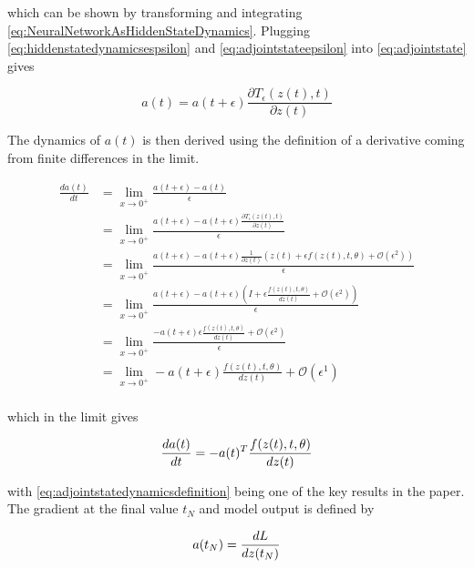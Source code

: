 \documentclass[10pt]{reportMaster}
\begin{document}
which can be shown by transforming and integrating \ref{eq:NeuralNetworkAsHiddenStateDynamics}. Plugging \ref{eq:hiddenstatedynamicsespsilon} and \ref{eq:adjointstateepsilon} into \ref{eq:adjointstate} gives

\begin{equation}
\label{eq:adjointstatedefinition}
a(t) = a(t+\epsilon) \frac{\partial T_{\epsilon}(z(t), t)}{\partial z(t)}
\end{equation}

The dynamics of $a(t)$ is then derived using the definition of a derivative coming from finite differences in the limit.

\begin{equation} \begin{split}
\label{eq:adjstate} 
\frac{da(t)}{dt}
& =  \lim_{x \to 0^{+}}  \frac{a(t+\epsilon) - a(t)}{\epsilon}\\
& =  \lim_{x \to 0^{+}}  \frac{a(t+\epsilon) - a(t+\epsilon) \frac{\partial T_{\epsilon}(z(t), t)}{\partial z(t)}}{\epsilon}\\
& =  \lim_{x \to 0^{+}} \frac{a(t+\epsilon) - a(t+\epsilon) \frac{1}{\partial z(t)} (z(t) + \epsilon f(z(t), t, \theta) + \mathcal{O}(\epsilon^{2}))}{\epsilon} \\
& =  \lim_{x \to 0^{+}} \frac{a(t+\epsilon) - a(t+\epsilon) (\mathit{I} + \epsilon \frac{f(z(t), t, \theta)}{dz(t)} + \mathcal{O}(\epsilon^{2}))}{\epsilon} \\
& =  \lim_{x \to 0^{+}} \frac{-a(t+\epsilon) \epsilon \frac{f(z(t), t, \theta)}{dz(t)} + \mathcal{O}(\epsilon^{2})}{\epsilon} \\
& =  \lim_{x \to 0^{+}} -a(t+\epsilon) \frac{f(z(t), t, \theta)}{dz(t)} + \mathcal{O}(\epsilon^{1})\\
\end{split}
\end{equation}

which in the limit gives

\begin{equation}
\label{eq:adjointstatedynamicsdefinition}
\frac{da(t)}{dt} = -a(t)^{T} \frac{f(z(t), t, \theta)}{dz(t)}\\
\end{equation}

with \ref{eq:adjointstatedynamicsdefinition} being one of the key results in the paper. The gradient at the final value $t_{N}$ and model output is defined by 

\begin{equation}
\label{eq:adjointstatefinalvalue}
a(t_{N}) =  \frac{dL}{dz(t_{N})}\\
\end{equation}
\end{document}
